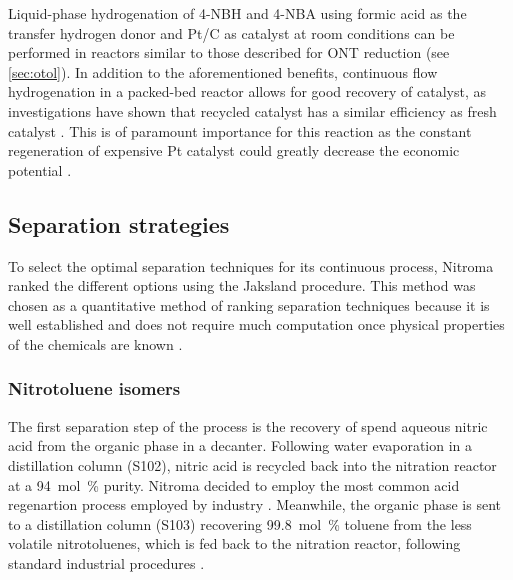 Liquid-phase hydrogenation of 4-NBH and 4-NBA using formic acid as the transfer hydrogen donor and Pt/C as catalyst at room conditions can be performed in reactors similar to those described for ONT reduction (see \cref{sec:otol}). In addition to the aforementioned benefits, continuous flow hydrogenation in a packed-bed reactor allows for good recovery of catalyst, as investigations have shown that recycled catalyst has a similar efficiency as fresh catalyst \cite{rahman_fast_2020}. This is of paramount importance for this reaction as the constant regeneration of expensive Pt catalyst could greatly decrease the economic potential \cite{rahman_fast_2020}. 


\subsection{Separation strategies}

To select the optimal separation techniques for its continuous process, Nitroma ranked the different options using the Jaksland procedure. This method was chosen as a quantitative method of ranking separation techniques because it is well established and does not require much computation once physical properties of the chemicals are known \cite{jaksland_separation_1995}. 

\subsubsection{Nitrotoluene isomers}

The first separation step of the process is the recovery of spend  aqueous nitric acid from the organic phase in a decanter. Following water evaporation in a distillation column (S102), nitric acid is recycled back into the nitration reactor at a \SI{94}{mol\percent} purity. Nitroma decided to employ the most common acid regenartion process employed by industry \cite{dugal_nitrobenzene_2005}. Meanwhile, the organic phase is sent to a distillation column (S103) recovering \SI{99.8}{mol\percent} toluene from the less volatile nitrotoluenes, which is fed back to the nitration reactor, following standard industrial procedures \cite{bowers_toluidines_2000}.

